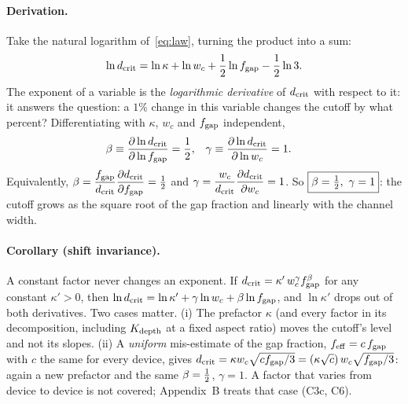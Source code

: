 \paragraph{Derivation.} Take the natural logarithm of~\eqref{eq:law}, turning the product into
a sum:
\begin{equation}
\ln d_{\mathrm{crit}} = \ln\kappa + \ln w_c + \frac{1}{2}\ln f_{\mathrm{gap}} - \frac{1}{2}\ln 3.
\end{equation}
The exponent of a variable is the \emph{logarithmic derivative} of $d_{\mathrm{crit}}$ with respect to it:
it answers the question: a $1\%$ change in this variable changes the cutoff by what percent?
Differentiating with $\kappa$, $w_c$ and $f_{\mathrm{gap}}$ independent,
\begin{align}
\beta &\equiv \frac{\partial \ln d_{\mathrm{crit}}}{\partial \ln f_{\mathrm{gap}}} = \frac{1}{2}, &
\gamma &\equiv \frac{\partial \ln d_{\mathrm{crit}}}{\partial \ln w_c} = 1.
\end{align}
Equivalently, $\beta = \dfrac{f_{\mathrm{gap}}}{d_{\mathrm{crit}}}\dfrac{\partial d_{\mathrm{crit}}}{\partial f_{\mathrm{gap}}} = \tfrac{1}{2}$ and
$\gamma = \dfrac{w_c}{d_{\mathrm{crit}}}\dfrac{\partial d_{\mathrm{crit}}}{\partial w_c} = 1$. So
$\boxed{\beta=\tfrac{1}{2},\ \gamma=1}$: the cutoff grows as the square root of the gap fraction and
linearly with the channel width.

\paragraph{Corollary (shift invariance).} A constant factor never changes an exponent. If
$d_{\mathrm{crit}} = \kappa'\,w_c^{\gamma}f_{\mathrm{gap}}^{\beta}$ for any constant $\kappa'>0$, then
$\ln d_{\mathrm{crit}}=\ln \kappa'+\gamma\ln w_c+\beta\ln f_{\mathrm{gap}}$, and $\ln \kappa'$ drops out of both derivatives. Two
cases matter. (i) The prefactor $\kappa$ (and every factor in its decomposition, including
$K_{\mathrm{depth}}$ at a fixed aspect ratio) moves the cutoff's level and not its slopes. (ii) A
\emph{uniform} mis-estimate of the gap fraction, $f_{\mathrm{eff}}=c\,f_{\mathrm{gap}}$ with $c$ the same
for every device, gives $d_{\mathrm{crit}}=\kappa w_c\sqrt{cf_{\mathrm{gap}}/3}=(\kappa\sqrt c)\,w_c\sqrt{f_{\mathrm{gap}}/3}$:
again a new prefactor and the same $\beta=\tfrac{1}{2}$, $\gamma=1$. A factor that varies from device
to device is not covered; Appendix~B treats that case (C3c, C6).


